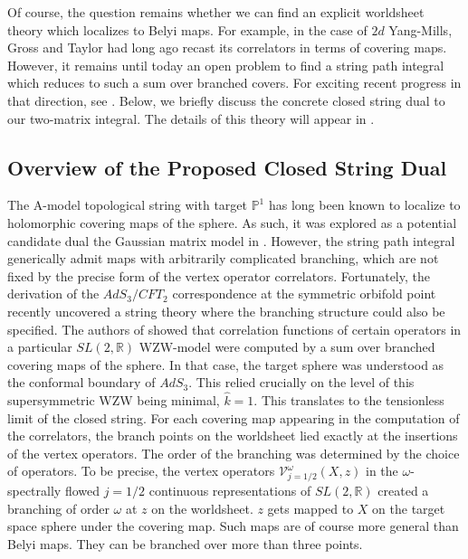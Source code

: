 \documentclass[english]{article}
\renewcommand{\>}{\rangle}
\newcommand{\<}{\langle}
\renewcommand{\(}{\left(}
\renewcommand{\)}{\right)}
\begin{document}
Of course, the question remains whether we can find an explicit worldsheet theory which localizes to Belyi maps. For example, in the case of $2d$ Yang-Mills, Gross and Taylor had long ago recast its correlators in terms of covering maps. However, it remains until today an open problem to find a string path integral which reduces to such a sum over branched covers. For exciting recent progress in that direction, see \cite{Aharony:2023tam,KomatsuWIP,GaberdielWIP}. Below, we briefly discuss the concrete closed string dual to our two-matrix integral. The details of this theory will appear in \cite{DSDIII}.

\subsection{Overview of the Proposed Closed String Dual}\label{sec:Amodel}

The A-model topological string with target $\mathbb{P}^1$ has long been known to localize to holomorphic covering maps of the sphere. As such, it was explored as a potential candidate dual the Gaussian matrix model in \cite{gopakumar2013correlators}. However, the string path integral generically admit maps with arbitrarily complicated branching, which are not fixed by the precise form of the vertex operator correlators. Fortunately, the derivation of the $AdS_{3}/CFT_{2}$ correspondence at the symmetric orbifold point recently uncovered a string theory where the branching structure could also be specified. The authors of \cite{eberhardt2019worldsheet} showed that correlation functions of certain operators in a particular $SL(2,\mathbb{R})$ WZW-model were computed by a sum over branched covering maps of the sphere. In that case, the target sphere was understood as the conformal boundary of $AdS_{3}$. This relied crucially on the level of this supersymmetric WZW being minimal, $\hat{k}=1$. This translates to the tensionless limit of the closed string. For each covering map appearing in the computation of the correlators, the branch points on the worldsheet lied exactly at the insertions of the vertex operators. The order of the branching was determined by the choice of operators. To be precise, the vertex operators $\mathcal{V}_{j=1/2}^{\omega}(X,z)$ in the $\omega$-spectrally flowed $j=1/2$ continuous representations of $SL(2,\mathbb{R})$ created a branching of order $\omega$ at $z$ on the worldsheet. $z$ gets mapped to $X$ on the target space sphere under the covering map. Such maps are of course more general than Belyi maps. They can be branched over more than three points. 
\end{document}
